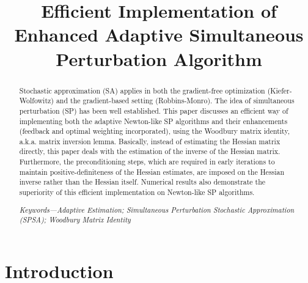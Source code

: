 \documentclass[conference,10.3cpt]{IEEEtran}
\begin{document}
\title{Efficient Implementation of Enhanced Adaptive
  Simultaneous Perturbation Algorithm}
\author{
   \and
    \and {} }

\maketitle

\begin{abstract} Stochastic approximation (SA) applies in both the
  gradient-free optimization (Kiefer-Wolfowitz) and the gradient-based
  setting (Robbins-Monro). The idea of simultaneous perturbation (SP) has been well established. This paper discusses an efficient way of
  implementing both the adaptive Newton-like SP algorithms and their enhancements
  (feedback and optimal weighting incorporated), using the Woodbury
  matrix identity, a.k.a. matrix inversion lemma. Basically, instead of
  estimating the Hessian matrix directly, this paper deals with the
  estimation of the inverse of the Hessian matrix. Furthermore, the
  preconditioning steps, which are required in early iterations to
  maintain positive-definiteness of the Hessian estimates, are imposed on
  the Hessian inverse rather than the Hessian itself. Numerical results
  also demonstrate the superiority of this efficient implementation on
  Newton-like SP algorithms.

  \textit{Keywords---Adaptive Estimation; Simultaneous
    Perturbation Stochastic Approximation (SPSA); Woodbury Matrix
    Identity}
\end{abstract}

\IEEEpeerreviewmaketitle

\section{Introduction}
\label{Introduction}
\end{document}
